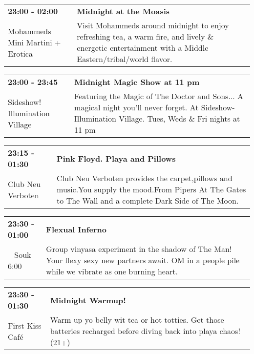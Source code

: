 \begin{tabular}{ p{1in} p{2.2in} }
    \textbf{23:00 - 02:00} & \textbf{Midnight at the Moasis} \\
    Mohammeds Mini Martini + Erotica \newline  & Visit Mohammeds around midnight to enjoy refreshing tea, a warm fire, and lively \& energetic entertainment with a Middle Eastern/tribal/world flavor. \\
    \hline 
\end{tabular}
    
\begin{tabular}{ p{1in} p{2.2in} }
    \textbf{23:00 - 23:45} & \textbf{Midnight Magic Show at 11 pm} \\
    Sideshow! \newline Illumination Village & Featuring the Magic of The Doctor and Sons... A magical night you'll never forget. At Sideshow- Illumination Village. Tues, Weds \& Fri nights at 11 pm \\
    \hline 
\end{tabular}
    
\begin{tabular}{ p{1in} p{2.2in} }
    \textbf{23:15 - 01:30} & \textbf{Pink Floyd. Playa and Pillows } \\
    Club Neu Verboten \newline  & Club Neu Verboten provides the carpet,pillows and music.You supply the mood.From Pipers At The Gates to The Wall and a complete Dark Side of The Moon. \\
    \hline 
\end{tabular}
    
\begin{tabular}{ p{1in} p{2.2in} }
    \textbf{23:30 - 01:00} & \textbf{Flexual Inferno} \\
    ~ \newline Souk 6:00 & Group vinyasa experiment in the shadow of The Man! Your flexy sexy new partners await. OM in a people pile while we vibrate as one burning heart. \\
    \hline 
\end{tabular}
    
\begin{tabular}{ p{1in} p{2.2in} }
    \textbf{23:30 - 01:30} & \textbf{Midnight Warmup!} \\
    First Kiss Caf\'e \newline  & Warm up yo belly wit tea or hot totties.  Get those batteries recharged before diving back into playa chaos! (21+) \\
    \hline 
\end{tabular}
    
